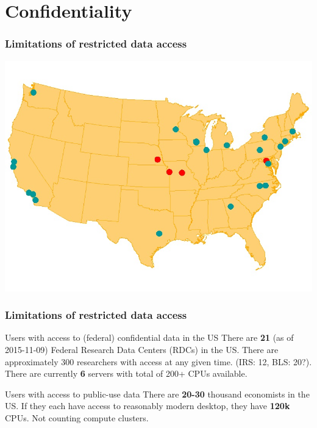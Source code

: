 \section{Confidentiality}

\begin{frame}
	\frametitle{Limitations of restricted data access}
	\includegraphics[width=\textwidth]{rdcmap_triad1c}
\end{frame}

\begin{frame}
	\frametitle{Limitations of restricted data access}
	\begin{block}{Users with access to (federal) confidential data in the US}
		There are {\large \textbf{21}} ({\small as of 2015-11-09}) Federal Research Data Centers (RDCs) in the US. There are approximately 300 researchers with access at any given time. (IRS: 12, BLS: 20?). There are currently {\large \textbf{6}} servers with total of 200+ CPUs available.
	\end{block}\pause
	\begin{block}{Users with access to public-use data}
		There are {\large \textbf{20-30} thousand} economists in the US. If they each have access to reasonably modern desktop, they have {\large \textbf{120k}} CPUs. Not counting compute clusters.
	\end{block}
\end{frame}

